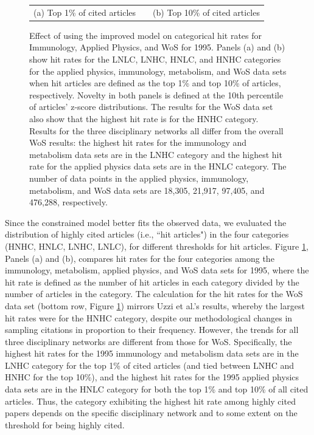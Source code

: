 \documentclass[NETN]{stjour}
\begin{document}
\begin{figure}
\begin{tabular}{ccc}
(a) Top 1\% of cited articles & & (b) Top 10\% of cited articles \\
\end{tabular}
\caption{Effect of using the improved model on  categorical hit rates for Immunology, Applied Physics, and WoS for 1995. Panels (a) and (b) show hit rates for the LNLC, LNHC, HNLC, and HNHC categories for the applied physics, immunology, metabolism, and WoS data sets when hit articles are defined as the top 1\% and top 10\% of articles, respectively.  Novelty in both panels is defined at the 10th percentile of articles' z-score distributions. 
The results for the WoS data set also show that the highest hit rate is for the HNHC category.  Results for the three disciplinary networks all differ from the overall WoS results: the highest hit rates for the immunology and metabolism data sets  are in the LNHC category and the highest hit rate for the applied physics data sets are in the HNLC category. The number of data points in the applied physics, immunology, metabolism, and WoS data sets are 18,305, 21,917, 97,405, and 476,288, respectively.  
}
\label{fig:Fig2}
\end{figure}

Since the constrained model better fits the observed data, we evaluated the distribution of highly cited articles  (i.e., ``hit articles") in the four categories (HNHC, HNLC, LNHC, LNLC), for different thresholds for hit articles. Figure \ref{fig:Fig2}, Panels (a) and (b), compares hit rates for the four categories among the immunology, metabolism, applied physics, and WoS data sets for 1995, where the hit rate is defined as the number of hit articles in each category divided by the number of articles in the category. The calculation for the hit rates for the WoS data set (bottom row, Figure \ref{fig:Fig2}) mirrors Uzzi et al.'s results, whereby the largest hit rates were for the HNHC category, despite our methodological changes in sampling citations in proportion to their frequency.  However, the trends  for all three  disciplinary networks  are different from those for WoS. Specifically, the highest hit rates for the 1995 immunology and metabolism data sets are in the LNHC category for the top 1\% of cited articles (and tied between LNHC and HNHC for the top 10\%), and the highest hit rates for the 1995 applied physics data sets are in the HNLC category for both the top 1\% and top 10\% of all cited articles.  Thus, the category exhibiting the highest hit rate among highly cited papers depends on the specific disciplinary network and to some extent on the threshold for being highly cited.
 
\end{document}
